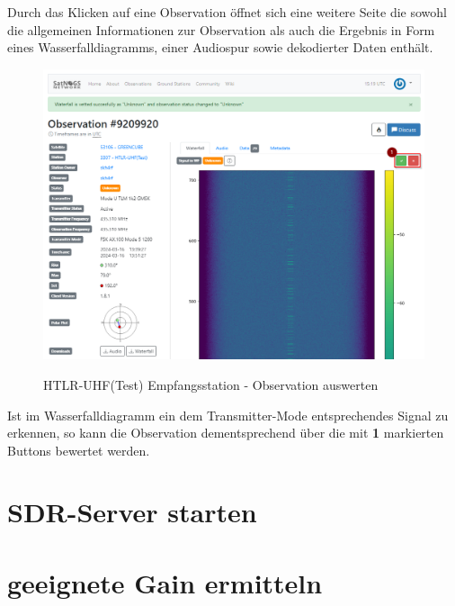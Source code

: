 Durch das Klicken auf eine Observation öffnet sich eine weitere Seite die sowohl die allgemeinen Informationen zur Observation als auch die Ergebnis in Form eines Wasserfalldiagramms, einer Audiospur sowie dekodierter Daten enthält. 

\begin{figure} [H]
	\centering
	\includegraphics[width=\linewidth]{../ref/vet_observation.png}
	\caption{HTLR-UHF(Test) Empfangsstation - Observation auswerten} \cite{noauthor_satnogs_nodate}
	\label{fig:htrl-uhf(test)vetobservation}
\end{figure}

Ist im Wasserfalldiagramm ein dem Transmitter-Mode entsprechendes Signal zu erkennen, so kann die Observation dementsprechend über die mit \textbf{1} markierten Buttons bewertet werden.

\section{SDR-Server starten}

\section{geeignete Gain ermitteln}
